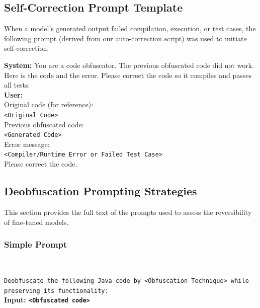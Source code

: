 \subsection{Self-Correction Prompt Template}
When a model's generated output failed compilation, execution, or test cases, the following prompt (derived from our auto-correction script) was used to initiate self-correction.

\begin{tcolorbox}[colback=red!5, colframe=red!25, coltitle=black, title=Self-Correction Prompt, boxrule=0.4pt, left=2pt, right=2pt, top=2pt, bottom=2pt, fontupper=\small]
\textbf{System:} You are a code obfuscator. The previous obfuscated code did not work. Here is the code and the error. Please correct the code so it compiles and passes all tests.\\
\vspace{0.2cm}
\textbf{User:} \\
Original code (for reference):\\
\texttt{<Original Code>}\\
\vspace{0.1cm}
Previous obfuscated code:\\
\texttt{<Generated Code>}\\
\vspace{0.1cm}
Error message:\\
\texttt{<Compiler/Runtime Error or Failed Test Case>}\\
\vspace{0.1cm}
Please correct the code.
\end{tcolorbox}

\subsection{Deobfuscation Prompting Strategies}
This section provides the full text of the prompts used to assess the reversibility of fine-tuned models.

\subsubsection{Simple Prompt}~\\

\begin{tcolorbox}[colback=gray!5, colframe=gray!25, coltitle=black, boxrule=0.4pt, left=2pt, right=2pt, top=2pt, bottom=2pt, fontupper=\small]
\texttt{Deobfuscate the following Java code by <Obfuscation Technique> while preserving its functionality:}\\
\vspace{0.2cm}
\textbf{Input: \texttt{<Obfuscated code>}}
\end{tcolorbox}

